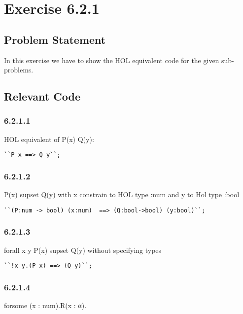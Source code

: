\documentclass{report}
\begin{document}
\chapter{Exercise 6.2.1}
\label{cha:exercise-6.2.1}

\section{Problem Statement}
\label{sec:problem-statement-5}

In this exercise we have to show the HOL equivalent code for the given sub-problems.

\section{Relevant Code}
\label{sec:relevant-code-5}

\subsection{6.2.1.1}
\label{sec:6.2.1.1}

 HOL equivalent of P(x)  Q(y):

\lstset{frameround=tttt}
\begin{lstlisting}[frame=tRBL]
``P x ==> Q y``;
\end{lstlisting}

\subsection{6.2.1.2}
\label{sec:6.2.1.2}
P(x) supset Q(y) with x constrain to HOL type :num and y to Hol type :bool 

\lstset{frameround=tttt}
\begin{lstlisting}[frame=tRBL]
``(P:num -> bool) (x:num)  ==> (Q:bool->bool) (y:bool)``;
\end{lstlisting}

\subsection{6.2.1.3}
\label{sec:6.2.1.3}
forall x y P(x) supset Q(y) without specifying types

\lstset{frameround=tttt}
\begin{lstlisting}[frame=tRBL]
``!x y.(P x) ==> (Q y)``;
\end{lstlisting}

\subsection{6.2.1.4}
\label{sec:6.2.1.4}
forsome (x : num).R(x : α).
\end{document}
